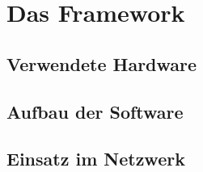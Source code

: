 \chapter{Das Framework}
\section{Verwendete Hardware}
\section{Aufbau der Software}
\section{Einsatz im Netzwerk} 


